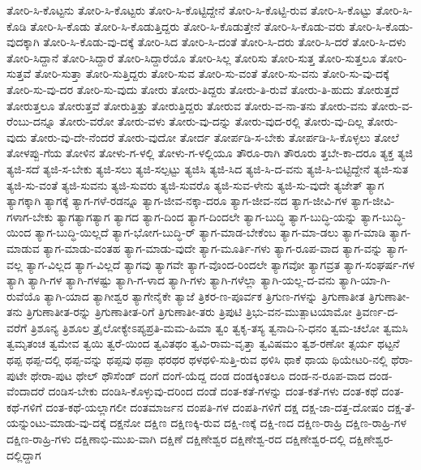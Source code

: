 ತೋರಿ-ಸಿ-ಕೊಟ್ಟನು
ತೋರಿ-ಸಿ-ಕೊಟ್ಟರು
ತೋರಿ-ಸಿ-ಕೊಟ್ಟಿದ್ದೇನೆ
ತೋರಿ-ಸಿ-ಕೊಟ್ಟಿ-ರುವ
ತೋರಿ-ಸಿ-ಕೊಟ್ಟು
ತೋರಿ-ಸಿ-ಕೊಡಿ
ತೋರಿ-ಸಿ-ಕೊಡು
ತೋರಿ-ಸಿ-ಕೊಡುತ್ತಿದ್ದರು
ತೋರಿ-ಸಿ-ಕೊಡುತ್ತೇನೆ
ತೋರಿ-ಸಿ-ಕೊಡು-ವರು
ತೋರಿ-ಸಿ-ಕೊಡು-ವುದಕ್ಕಾಗಿ
ತೋರಿ-ಸಿ-ಕೊಡು-ವು-ದಕ್ಕೆ
ತೋರಿ-ಸಿದ
ತೋರಿ-ಸಿ-ದಂತೆ
ತೋರಿ-ಸಿ-ದರು
ತೋರಿ-ಸಿ-ದರೆ
ತೋರಿ-ಸಿ-ದಳು
ತೋರಿ-ಸಿದ್ದಾನೆ
ತೋರಿ-ಸಿದ್ದಾರೆ
ತೋರಿ-ಸಿದ್ದಾರೆಯೊ
ತೋರಿ-ಸಿಲ್ಲ
ತೋರಿಸು
ತೋರಿ-ಸುತ್ತ
ತೋರಿ-ಸುತ್ತಲೂ
ತೋರಿ-ಸುತ್ತವೆ
ತೋರಿ-ಸುತ್ತಾ
ತೋರಿ-ಸುತ್ತಿದ್ದರು
ತೋರಿ-ಸುವ
ತೋರಿ-ಸು-ವಂತೆ
ತೋರಿ-ಸು-ವನು
ತೋರಿ-ಸು-ವು-ದಕ್ಕೆ
ತೋರಿ-ಸು-ವು-ದರ
ತೋರಿ-ಸು-ವುದು
ತೋರು
ತೋರು-ತಿದ್ದರು
ತೋರು-ತಿ-ರುವೆ
ತೋರು-ತಿ-ಹುದು
ತೋರುತ್ತದೆ
ತೋರುತ್ತಲೂ
ತೋರುತ್ತವೆ
ತೋರುತ್ತಿತ್ತು
ತೋರುತ್ತಿದ್ದರು
ತೋರುವ
ತೋರು-ವ-ನಾ-ತನು
ತೋರು-ವನು
ತೋರು-ವ-ರೆಂಬು-ದನ್ನೂ
ತೋರು-ವರೋ
ತೋರು-ವಳು
ತೋರು-ವು-ದನ್ನು
ತೋರು-ವುದ-ರಲ್ಲಿ
ತೋರು-ವು-ದಿಲ್ಲ
ತೋರು-ವುದು
ತೋರು-ವು-ದೇ-ನೆಂದರೆ
ತೋರು-ವುದೋ
ತೋರ್ದ
ತೋರ್ಪಡಿ-ಸ-ಬೇಕು
ತೋರ್ಪಡಿ-ಸಿ-ಕೊಳ್ಳಲು
ತೋಲೆ
ತೋಳಪ್ಪು-ಗೆಯ
ತೋಳಿನ
ತೋಳು-ಗ-ಳಲ್ಲಿ
ತೋಳು-ಗ-ಳಲ್ಲಿಯೂ
ತೌರೂ-ರಾಗಿ
ತೌರೂರು
ತ್ತಬೇ-ಕಾ-ದರೂ
ತ್ಯಕ್ತ
ತ್ಯಜಿ
ತ್ಯಜಿ-ಸದೆ
ತ್ಯಜಿ-ಸ-ಬೇಕು
ತ್ಯಜಿ-ಸಲು
ತ್ಯಜಿ-ಸಲ್ಪಟ್ಟು
ತ್ಯಜಿಸಿ
ತ್ಯಜಿ-ಸಿದ
ತ್ಯಜಿ-ಸಿ-ದ-ವನು
ತ್ಯಜಿ-ಸಿ-ಬಿಟ್ಟಿದ್ದೇನೆ
ತ್ಯಜಿ-ಸುತ
ತ್ಯಜಿ-ಸು-ವಂತೆ
ತ್ಯಜಿ-ಸುವನು
ತ್ಯಜಿ-ಸುವರು
ತ್ಯಜಿ-ಸುವರೊ
ತ್ಯಜಿ-ಸುವ-ಳೇನು
ತ್ಯಜಿ-ಸು-ವುದೇ
ತ್ಯಜೇತ್
ತ್ಯಾಗ
ತ್ಯಾಗಕ್ಕಾಗಿ
ತ್ಯಾಗಕ್ಕೆ
ತ್ಯಾಗ-ಗಳೆ-ರಡನ್ನೂ
ತ್ಯಾಗ-ಜೀವ-ನಕ್ಕಾ-ದರೂ
ತ್ಯಾಗ-ಜೀವ-ನದ
ತ್ಯಾಗ-ಜೀವಿ-ಗಳ
ತ್ಯಾಗ-ಜೀವಿ-ಗಳಾಗ-ಬೇಕು
ತ್ಯಾಗತ್ಯಾಗತ್ಯಾಗ
ತ್ಯಾಗದ
ತ್ಯಾಗ-ದಿಂದ
ತ್ಯಾಗ-ದಿಂದಲೇ
ತ್ಯಾಗ-ಬುದ್ಧಿ
ತ್ಯಾಗ-ಬುದ್ಧಿ-ಯನ್ನು
ತ್ಯಾಗ-ಬುದ್ಧಿ-ಯಿಂದ
ತ್ಯಾಗ-ಬುದ್ಧಿ-ಯಿಲ್ಲದೆ
ತ್ಯಾಗ-ಭೋಗ-ಬುದ್ಧಿ-‌ರ್
ತ್ಯಾಗ-ಮಾಡ-ಬೇಕೆಂಬ
ತ್ಯಾಗ-ಮಾ-ಡಲು
ತ್ಯಾಗ-ಮಾಡಿ
ತ್ಯಾಗ-ಮಾಡುವ
ತ್ಯಾಗ-ಮಾಡು-ವಂತಹ
ತ್ಯಾಗ-ಮಾಡು-ವುದೇ
ತ್ಯಾಗ-ಮೂರ್ತಿ-ಗಳು
ತ್ಯಾಗ-ರೂಪ-ವಾದ
ತ್ಯಾಗ-ವನ್ನು
ತ್ಯಾಗ-ವಲ್ಲ
ತ್ಯಾಗ-ವಿಲ್ಲದ
ತ್ಯಾಗ-ವಿಲ್ಲದೆ
ತ್ಯಾಗವು
ತ್ಯಾಗವೇ
ತ್ಯಾಗ-ವೊಂದ-ರಿಂದಲೇ
ತ್ಯಾಗವೋ
ತ್ಯಾಗವ್ರತ
ತ್ಯಾಗ-ಸಂಘರ್ಷ-ಗಳ
ತ್ಯಾಗಿ
ತ್ಯಾಗಿ-ಗಳ
ತ್ಯಾಗಿ-ಗಳಷ್ಟು
ತ್ಯಾಗಿ-ಗ-ಳಾದ
ತ್ಯಾಗಿ-ಗಳು
ತ್ಯಾಗಿ-ಗಳೆಲ್ಲಾ
ತ್ಯಾಗಿ-ಯಲ್ಲ-ದ-ವನು
ತ್ಯಾಗಿ-ಯಾ-ಗಿ-ರುವೆಯೊ
ತ್ಯಾಗಿ-ಯಾದ
ತ್ಯಾಗೀಶ್ವರ
ತ್ಯಾಗೇನೈಕೇ
ತ್ಯಾಜೆ
ತ್ರಿಕರ-ಣ-ಪೂರ್ವಕ
ತ್ರಿಗುಣ-ಗಳನ್ನು
ತ್ರಿಗುಣಾತೀತ
ತ್ರಿಗುಣಾತೀ-ತನು
ತ್ರಿಗುಣಾತೀತ-ರನ್ನು
ತ್ರಿಗುಣಾತೀತ-ರಿಗೆ
ತ್ರಿಗುಣಾತೀ-ತರು
ತ್ರಿಪುಟಿ
ತ್ರಿಭು-ವನ-ಮುತ್ಪಾಟಯಾಮೋ
ತ್ರಿವರ್ಣ-ದ-ವರೆಗೆ
ತ್ರಿಶೂನ್ಯ
ತ್ರಿಶೂಲ
ತ್ರೈಲೋಕ್ಯೇಽಪ್ಯಪ್ರತಿ-ಮಮ-ಹಿಮಾ
ತ್ವಂ
ತ್ವಕೃ-ತಸ್ಯ
ತ್ವನಾದಿ-ನಿ-ಧನಂ
ತ್ವಮ-ಚಲೋ
ತ್ವಮಸಿ
ತ್ವಮೃತಂಚ
ತ್ವಮೇವ
ತ್ವಯಿ
ತ್ವರೆ-ಯಿಂದ
ತ್ವವಿತಥಂ
ತ್ವವಿ-ರಾಮ-ವೃತ್ತಾ
ತ್ವವಿಷಮಂ
ತ್ವಶ-ರಣೋ
ತ್ಸರ್ಯ
ಥಟ್ಟನೆ
ಥಪ್ಪ
ಥಪ್ಪ-ದಲ್ಲಿ
ಥಪ್ಪ-ವನ್ನು
ಥಪ್ಪವು
ಥಪ್ಪಾ
ಥರಥರ
ಥಳಥಳಿ-ಸುತ್ತಿ-ರುವ
ಥಳಿಸಿ
ಥಾಕೆ
ಥಾಯ
ಥಿಯೇಟರಿ-ನಲ್ಲಿ
ಥೆರಾ-ಪುಟೇ
ಥೇರಾ-ಪುಟ
ಥೇಲ್
ಥೌಸೆಂಡ್
ದಂಗೆ
ದಂಗೆ-ಯೆದ್ದ
ದಂಡ
ದಂಡಕ್ಕಿಂತಲೂ
ದಂಡ-ನ-ರೂಪ-ವಾದ
ದಂಡ-ವೆಂದಾದರೆ
ದಂಡಿಸ-ಬೇಕು
ದಂಡಿಸಿ-ಕೊಳ್ಳುವು-ದರಿಂದ
ದಂಡೆ
ದಂತ-ಕತೆ-ಗಳನ್ನು
ದಂತ-ಕತೆ-ಗಳು
ದಂತ-ಕಥೆ
ದಂತ-ಕಥೆ-ಗಳಿಗೆ
ದಂತ-ಕಥೆ-ಯಲ್ಲಾಗಲೀ
ದಂತಮಾರ್ಜನ
ದಂಪತಿ-ಗಳ
ದಂಪತಿ-ಗಳಿಗೆ
ದಕ್ಷ
ದಕ್ಷ-ಜಾ-ದತ್ತ-ದೋಷಂ
ದಕ್ಷ-ತೆ-ಯನ್ನುಂಟು-ಮಾಡು-ವು-ದಕ್ಕೆ
ದಕ್ಷನೋ
ದಕ್ಷಿಣ
ದಕ್ಷಿಣಕ್ಕಿ-ರುವ
ದಕ್ಷಿ-ಣಕ್ಕೆ
ದಕ್ಷಿ-ಣದ
ದಕ್ಷಿಣ-ರಾಹ್ರಿ
ದಕ್ಷಿಣ-ರಾಹ್ರಿ-ಗಳ
ದಕ್ಷಿಣ-ರಾಹ್ರಿ-ಗಳು
ದಕ್ಷಿಣಾಭಿ-ಮುಖ-ವಾಗಿ
ದಕ್ಷಿಣೆ
ದಕ್ಷಿಣೇಶ್ವರ
ದಕ್ಷಿಣೇಶ್ವ-ರದ
ದಕ್ಷಿಣೇಶ್ವರ-ದಲ್ಲಿ
ದಕ್ಷಿಣೇಶ್ವರ-ದಲ್ಲಿದ್ದಾಗ
